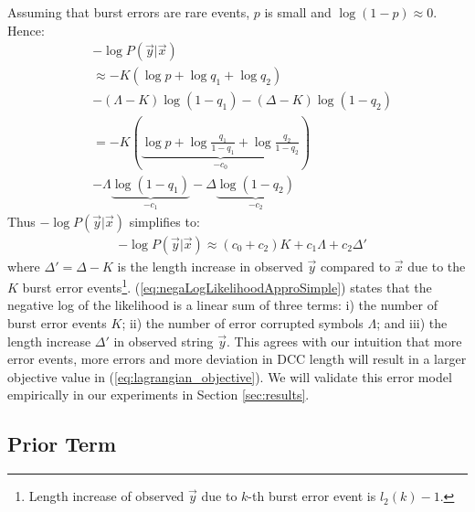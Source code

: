 Assuming that burst errors are rare events, $p$ is small and $\log(1-p) \approx 0$. Hence:
\begin{equation}
\label{eq:negaLogLikelihoodAppro}
\begin{split}
& -\log{P(\vec{y}|\vec{x})} \\
& \approx  - K(\log{p}+\log{q_1}+\log{q_2}) \\ 
& - (\Lambda-K)\log{(1-q_1)} - (\Delta-K)\log{(1-q_2)} \\
& = - K(\underbrace{\log{p}+\log{\frac{q_1}{1-q_1}}+\log{\frac{q_2}{1-q_2}}}_{-c_0}) \\
& - \Lambda \underbrace{\log(1-q_1)}_{-c_1} -
\Delta \underbrace{\log(1-q_2)}_{-c_2}
\end{split}
\end{equation}
Thus $-\log P(\vec{y}|\vec{x})$ simplifies to:
\begin{equation}
\label{eq:negaLogLikelihoodApproSimple}
\begin{split}
& -\log{P(\vec{y}|\vec{x})}  \approx  (c_0 + c_2) K + c_1 \Lambda 
+ c_2 \Delta'
\end{split}
\end{equation}
where $\Delta' = \Delta - K$ is the length increase in observed $\vec{y}$ compared to $\vec{x}$ due to the $K$ burst error events\footnote{Length increase of observed $\vec{y}$ due to $k$-th burst error event is $l_2(k) - 1$.}.
(\ref{eq:negaLogLikelihoodApproSimple}) states that the negative log of the likelihood is a linear sum of three terms: i) the number of burst error events $K$; ii) the number of error corrupted symbols $\Lambda$; and iii) the length increase $\Delta'$ in observed string $\vec{y}$.
This agrees with our intuition that more error events, more errors and more deviation in DCC length will result in a larger objective value in (\ref{eq:lagrangian_objective}).
We will validate this error model empirically in our experiments in Section \ref{sec:results}. 


\subsection{Prior Term}
\label{subsec:error_prior}

